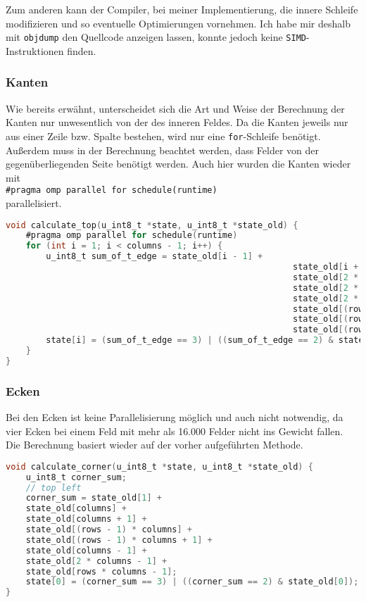 \documentclass[german,plainarticle,hyperref,utf8]{zihpub}
\begin{document}
	Zum anderen kann der Compiler, bei meiner Implementierung, die innere Schleife modifizieren und so eventuelle Optimierungen vornehmen. Ich habe mir deshalb mit \texttt{objdump} den Quellcode anzeigen lassen, konnte jedoch keine \texttt{SIMD}-Instruktionen finden.
	
	\subsubsection{Kanten}
	
	Wie bereits erwähnt, unterscheidet sich die Art und Weise der Berechnung der Kanten nur unwesentlich von der des inneren Feldes. Da die Kanten jeweils nur aus einer Zeile bzw. Spalte bestehen, wird nur eine \texttt{for}-Schleife benötigt. Außerdem muss in der Berechnung beachtet werden, dass Felder von der gegenüberliegenden Seite benötigt werden.
	Auch hier wurden die Kanten wieder mit\\
	
	\texttt{\#pragma omp parallel for schedule(runtime)}\\
	
	parallelisiert.	
	\begin{lstlisting}[language=C, caption=Berechnung der obersten Zeile]
void calculate_top(u_int8_t *state, u_int8_t *state_old) {
	#pragma omp parallel for schedule(runtime)
	for (int i = 1; i < columns - 1; i++) {
		u_int8_t sum_of_t_edge = state_old[i - 1] +
														 state_old[i + 1] +
														 state_old[2 * columns + (i - 1)] +
														 state_old[2 * columns + i] +
														 state_old[2 * columns + (i + 1)] +
														 state_old[(rows - 1) * columns + i] +
														 state_old[(rows - 1) * columns + i + 1] +
														 state_old[(rows - 1) * columns + i - 1];
		state[i] = (sum_of_t_edge == 3) | ((sum_of_t_edge == 2) & state_old[i]);
	}
}\end{lstlisting}
	\newpage
	\subsubsection{Ecken}
	Bei den Ecken ist keine Parallelisierung möglich und auch nicht notwendig, da vier Ecken bei einem Feld mit mehr als 16.000 Felder nicht ins Gewicht fallen.\\
	Die Berechnung basiert wieder auf der vorher aufgeführten Methode.\\
	
	\begin{lstlisting}[language=C, caption=Berechnung der Ecke oben links]
void calculate_corner(u_int8_t *state, u_int8_t *state_old) {
	u_int8_t corner_sum;
	// top left
	corner_sum = state_old[1] +
	state_old[columns] +
	state_old[columns + 1] +
	state_old[(rows - 1) * columns] +
	state_old[(rows - 1) * columns + 1] +
	state_old[columns - 1] +
	state_old[2 * columns - 1] +
	state_old[rows * columns - 1];
	state[0] = (corner_sum == 3) | ((corner_sum == 2) & state_old[0]);
}\end{lstlisting}
	
\end{document}
